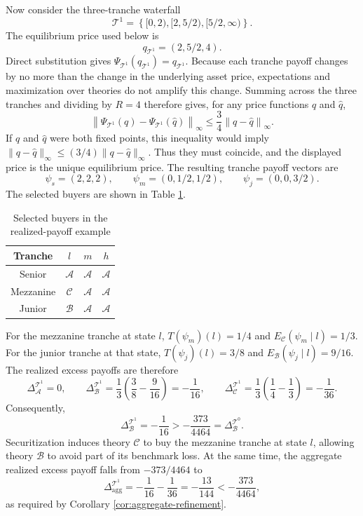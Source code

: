 \documentclass[11pt]{article}
\theoremstyle{plain}
\begin{document}
Now consider the three-tranche waterfall
\[
\mathcal{T}^1=
\left\{
[0,2),
[2,5/2),
[5/2,\infty)
\right\}.
\]
The equilibrium price used below is
\[
q_{\mathcal{T}^1}=(2,5/2,4).
\]
Direct substitution gives $\Psi_{\mathcal{T}^1}(q_{\mathcal{T}^1})=q_{\mathcal{T}^1}$. Because each tranche payoff changes by no more than the change in the underlying asset price, expectations and maximization over theories do not amplify this change. Summing across the three tranches and dividing by $R=4$ therefore gives, for any price functions $q$ and $\widehat q$,
\[
\left\|\Psi_{\mathcal{T}^1}(q)-\Psi_{\mathcal{T}^1}(\widehat q)\right\|_\infty
\leq
\frac{3}{4}\left\|q-\widehat q\right\|_\infty.
\]
If $q$ and $\widehat q$ were both fixed points, this inequality would imply $\|q-\widehat q\|_\infty\leq(3/4)\|q-\widehat q\|_\infty$. Thus they must coincide, and the displayed price is the unique equilibrium price. The resulting tranche payoff vectors are
\[
\psi_s=(2,2,2),
\qquad
\psi_m=(0,1/2,1/2),
\qquad
\psi_j=(0,0,3/2).
\]
The selected buyers are shown in Table \ref{tab:return-buyers}.

\begin{table}[h]
\caption{Selected buyers in the realized-payoff example}
\label{tab:return-buyers}
\centering
\begin{tabular}{c|ccc}
\hline
Tranche & $l$ & $m$ & $h$\\
\hline
Senior & $\mathcal{A}$ & $\mathcal{A}$ & $\mathcal{A}$\\
Mezzanine & $\mathcal{C}$ & $\mathcal{A}$ & $\mathcal{A}$\\
Junior & $\mathcal{B}$ & $\mathcal{A}$ & $\mathcal{A}$\\
\hline
\end{tabular}
\end{table}

For the mezzanine tranche at state $l$, $T(\psi_m)(l)=1/4$ and $E_\mathcal{C}(\psi_m\mid l)=1/3$. For the junior tranche at that state, $T(\psi_j)(l)=3/8$ and $E_\mathcal{B}(\psi_j\mid l)=9/16$. The realized excess payoffs are therefore
\[
\Delta_\mathcal{A}^{\mathcal{T}^1}=0,
\qquad
\Delta_\mathcal{B}^{\mathcal{T}^1}
=\frac{1}{3}\left(\frac{3}{8}-\frac{9}{16}\right)
=-\frac{1}{16},
\qquad
\Delta_\mathcal{C}^{\mathcal{T}^1}
=\frac{1}{3}\left(\frac{1}{4}-\frac{1}{3}\right)
=-\frac{1}{36}.
\]
Consequently,
\[
\Delta_\mathcal{B}^{\mathcal{T}^1}
=-\frac{1}{16}
>
-\frac{373}{4464}
=\Delta_\mathcal{B}^{\mathcal{T}^0}.
\]
Securitization induces theory $\mathcal{C}$ to buy the mezzanine tranche at state $l$, allowing theory $\mathcal{B}$ to avoid part of its benchmark loss. At the same time, the aggregate realized excess payoff falls from $-373/4464$ to
\[
\Delta_{\mathrm{agg}}^{\mathcal{T}^1}
=-\frac{1}{16}-\frac{1}{36}
=-\frac{13}{144}
<
-\frac{373}{4464},
\]
as required by Corollary \ref{cor:aggregate-refinement}.
\end{document}
